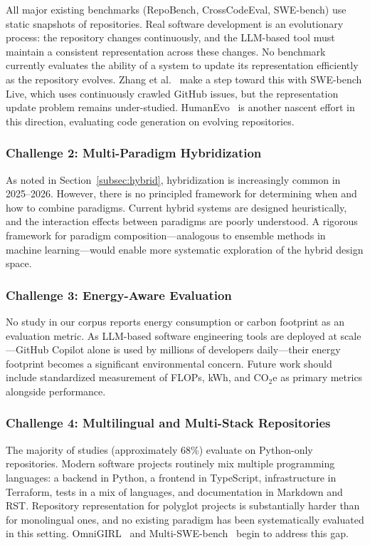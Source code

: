 All major existing benchmarks (RepoBench, CrossCodeEval, SWE-bench) use static snapshots of
repositories. Real software development is an evolutionary process: the repository changes
continuously, and the LLM-based tool must maintain a consistent representation across these
changes. No benchmark currently evaluates the ability of a system to update its representation
efficiently as the repository evolves. Zhang et al.~\cite{zhang2025swebenchlive} make a step
toward this with SWE-bench Live, which uses continuously crawled GitHub issues, but the
representation update problem remains under-studied. HumanEvo~\cite{zheng2025humanevo} is
another nascent effort in this direction, evaluating code generation on evolving repositories.

\subsubsection{Challenge 2: Multi-Paradigm Hybridization}

As noted in Section~\ref{subsec:hybrid}, hybridization is increasingly common in 2025--2026.
However, there is no principled framework for determining when and how to combine paradigms.
Current hybrid systems are designed heuristically, and the interaction effects between
paradigms are poorly understood. A rigorous framework for paradigm composition---analogous
to ensemble methods in machine learning---would enable more systematic exploration of the
hybrid design space.

\subsubsection{Challenge 3: Energy-Aware Evaluation}

No study in our corpus reports energy consumption or carbon footprint as an evaluation metric.
As LLM-based software engineering tools are deployed at scale---GitHub Copilot alone is used
by millions of developers daily---their energy footprint becomes a significant environmental
concern. Future work should include standardized measurement of FLOPs, kWh, and
$\text{CO}_2$e as primary metrics alongside performance.

\subsubsection{Challenge 4: Multilingual and Multi-Stack Repositories}

The majority of studies (approximately 68\%) evaluate on Python-only repositories. Modern
software projects routinely mix multiple programming languages: a backend in Python, a frontend
in TypeScript, infrastructure in Terraform, tests in a mix of languages, and documentation
in Markdown and RST. Repository representation for polyglot projects is substantially harder
than for monolingual ones, and no existing paradigm has been systematically evaluated in
this setting. OmniGIRL~\cite{guo2025omnigirl} and Multi-SWE-bench~\cite{zan2025multiswebench}
begin to address this gap.

